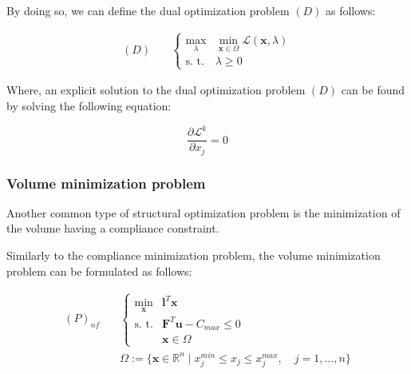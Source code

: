 By doing so, we can define the dual optimization problem $(D)$ as follows:

\begin{equation}
    \begin{aligned}
        (D) \quad & \begin{cases}
                        \max_{\lambda} & \min_{\bm{x} \in \Omega} \mathcal{L}(\bm{x}, \lambda) \\
                        \text{s. t.}   & \lambda \ge 0
                    \end{cases}
    \end{aligned}
    \label{eq:dual_compliance_minimization_problem}
\end{equation}

Where, an explicit solution to the dual optimization problem $(D)$ can be found by solving the following equation:

\begin{equation}
    \frac{\partial \mathcal{L}^k}{\partial x_j} = 0
\end{equation}

\subsubsection{Volume minimization problem}
\label{subsubsec:volume_minimization_problem}

Another common type of structural optimization problem is the minimization of the volume having a compliance constraint.

Similarly to the compliance minimization problem, the volume minimization problem can be formulated as follows:

\begin{equation}
    \begin{aligned}
        (P)_{nf} \quad & \begin{cases}
                             \min_{\bm{x}} & \bm{l}^T \bm{x}                  \\
                             \text{s. t.}  & \bm{F}^T \bm{u} - C_{max} \leq 0 \\
                                           & \bm{x} \in \Omega
                         \end{cases}                                    \\
                       & \Omega := \{ \bm{x} \in \mathbb{R}^n \mid x_j^{min} \le x_j \le x_j^{max}, \quad j = 1, \dots, n \}
    \end{aligned}
    \label{eq:volume_minimization_problem}
\end{equation}

